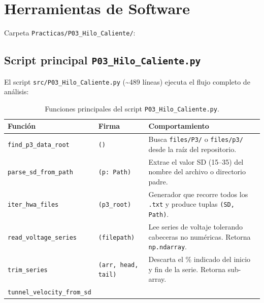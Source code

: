 \documentclass[12pt,a4paper]{article}
\begin{document}
\section{Herramientas de Software}
\label{sec:software}

Carpeta \texttt{Practicas/P03\_Hilo\_Caliente/}:

\subsection{Script principal \texttt{P03\_Hilo\_Caliente.py}}

El script \texttt{src/P03\_Hilo\_Caliente.py} (\textasciitilde489 líneas)
ejecuta el flujo completo de análisis:

\begin{table}[H]
	\centering
	\caption{Funciones principales del script \texttt{P03\_Hilo\_Caliente.py}.}
	\label{tab:funciones}
	\small
	\begin{tabularx}{\textwidth}{l l X}
		\toprule
		\textbf{Función} & \textbf{Firma}                & \textbf{Comportamiento}                       \\
		\midrule
		\texttt{find\_p3\_data\_root}
		                 & \texttt{()}                   & Busca \texttt{files/P3/} o \texttt{files/p3/}
		desde la raíz del repositorio.                                                                   \\
		\texttt{parse\_sd\_from\_path}
		                 & \texttt{(p: Path)}            & Extrae el valor SD (15--35) del nombre
		del archivo o directorio padre.                                                                  \\
		\texttt{iter\_hwa\_files}
		                 & \texttt{(p3\_root)}           & Generador que recorre todos los
		\texttt{.txt} y produce tuplas \texttt{(SD, Path)}.                                              \\
		\texttt{read\_voltage\_series}
		                 & \texttt{(filepath)}           & Lee series de voltaje tolerando cabeceras
		no numéricas.  Retorna \texttt{np.ndarray}.                                                      \\
		\texttt{trim\_series}
		                 & \texttt{(arr, head, tail)}    & Descarta el \% indicado del inicio
		y fin de la serie.  Retorna sub-array.                                                           \\
		\texttt{tunnel\_velocity\_from\_sd}

\end{tabularx}
\end{table}
\end{document}
